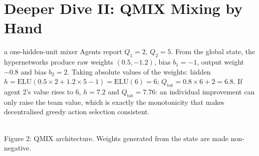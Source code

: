 \documentclass[11pt]{article}
\begin{document}
\section{Deeper Dive II: QMIX Mixing by Hand}
\begin{example}{a one-hidden-unit mixer}
Agents report $Q_1=2$, $Q_2=5$. From the global state, the hypernetworks produce raw weights $(0.5,-1.2)$, bias $b_1=-1$, output weight $-0.8$ and bias $b_2=2$. Taking absolute values of the weights: hidden $h=\text{ELU}(0.5\times2+1.2\times5-1)=\text{ELU}(6)=6$; $Q_{\text{tot}}=0.8\times6+2=6.8$. If agent 2's value rises to 6, $h=7.2$ and $Q_{\text{tot}}=7.76$: an individual improvement can only raise the team value, which is exactly the monotonicity that makes decentralised greedy action selection consistent.
\end{example}
\begin{center}\\{\small\color{GreyN}Figure 2: QMIX architecture. Weights generated from the state are made non-negative.}\end{center}
\end{document}
